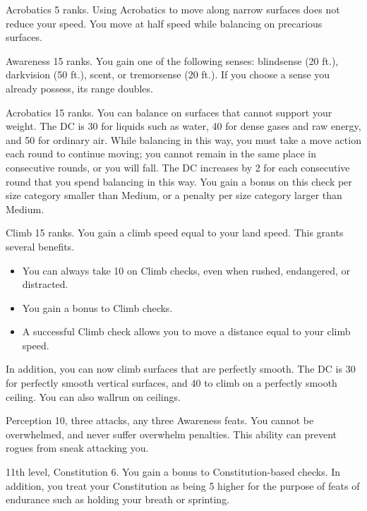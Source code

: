 \featpre Acrobatics 5 ranks.
\featben Using Acrobatics to move along narrow surfaces does not reduce your speed.
You move at half speed while balancing on precarious surfaces.

\featpre Awareness 15 ranks.
\featben You gain one of the following senses: blindsense (20 ft.), darkvision (50 ft.), scent, or tremorsense (20 ft.).
If you choose a sense you already possess, its range doubles.

\featpre Acrobatics 15 ranks.
\featben You can balance on surfaces that cannot support your weight.
The DC is 30 for liquids such as water, 40 for dense gases and raw energy, and 50 for ordinary air.
While balancing in this way, you must take a move action each round to continue moving; you cannot remain in the same place in consecutive rounds, or you will fall.
The DC increases by 2 for each consecutive round that you spend balancing in this way.
You gain a  bonus on this check per size category smaller than Medium, or a  penalty per size category larger than Medium.

\featpre Climb 15 ranks.
\featben You gain a climb speed equal to your land speed.
This grants several benefits.
\begin{itemize}
    \item You can always take 10 on Climb checks, even when rushed, endangered, or distracted.
    \item You gain a  bonus to Climb checks.
    \item A successful Climb check allows you to move a distance equal to your climb speed.
\end{itemize}

In addition, you can now climb surfaces that are perfectly smooth.
The DC is 30 for perfectly smooth vertical surfaces, and 40 to climb on a perfectly smooth ceiling.
You can also wallrun on ceilings.

\featpres Perception 10, three attacks, any three Awareness feats.
\featben You cannot be overwhelmed, and never suffer overwhelm penalties.
This ability can prevent rogues from sneak attacking you.

\featpres 11th level, Constitution 6.
\featben You gain a  bonus to Constitution-based checks.
In addition, you treat your Constitution as being 5 higher for the purpose of feats of endurance such as holding your breath or sprinting.

